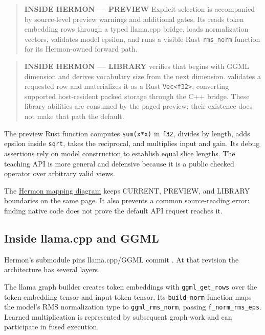 \documentclass[
  10pt,
]{article}
\begin{document}
\begin{quote}
\textbf{INSIDE HERMON --- PREVIEW} Explicit
\texttt{} selection is accompanied
by source-level preview warnings and additional gates. Its
\texttt{} reads token embedding rows through
a typed llama.cpp bridge, loads normalization vectors, validates model
epsilon, and runs a visible Rust \texttt{rms\_norm} function for its
Hermon-owned forward path.
\end{quote}

\begin{quote}
\textbf{INSIDE HERMON --- LIBRARY}
\texttt{} verifies that
\texttt{} begins with GGML dimension
\texttt{} and derives vocabulary size from
the next dimension.
\texttt{} validates a
requested row and materializes it as a Rust
\texttt{Vec\textless{}f32\textgreater{}}, converting supported
host-resident packed storage through the C++ bridge. These library
abilities are consumed by the paged preview; their existence does not
make that path the default.
\end{quote}

The preview Rust function computes \texttt{sum(x*x)} in \texttt{f32},
divides by length, adds epsilon inside \texttt{sqrt}, takes the
reciprocal, and multiplies input and gain. Its debug assertions rely on
model construction to establish equal slice lengths. The teaching API is
more general and defensive because it is a public checked operator over
arbitrary valid views.

The
\href{https://github.com/hermonai/inside-the-llm-engine/blob/astra-visual-rewrite/diagrams/transformer/hermon-llamacpp-normalization-path.txt}{Hermon
mapping diagram} keeps CURRENT, PREVIEW, and LIBRARY boundaries on the
same page. It also prevents a common source-reading error: finding
native code does not prove the default API request reaches it.

\subsection{Inside llama.cpp and
GGML}\label{inside-llama.cpp-and-ggml-1}

Hermon's submodule pins llama.cpp/GGML commit
\texttt{}. At that
revision the architecture has several layers.

The llama graph builder creates token embeddings with
\texttt{ggml\_get\_rows} over the token-embedding tensor and input-token
tensor. Its \texttt{build\_norm} function maps the model's RMS
normalization type to \texttt{ggml\_rms\_norm}, passing
\texttt{f\_norm\_rms\_eps}. Learned multiplication is represented by
subsequent graph work and can participate in fused execution.
\end{document}
